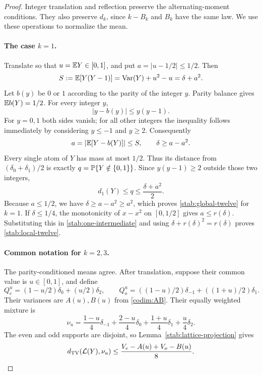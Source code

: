 \begin{proof}
Integer translation and reflection preserve the alternating-moment
conditions.  They also preserve \(d_k\), since \(k-B_k\) and \(B_k\)
have the same law.  We use these operations to normalize the mean.

\paragraph{The case \(k=1\).}
Translate so that \(u=\mathbb E Y\in[0,1]\), and put
\(a=|u-1/2|\le1/2\).  Then
\[
S:=\mathbb E[Y(Y-1)]
=\operatorname{Var}(Y)+u^2-u
=\delta+a^2.
\]
Let \(b(y)\) be \(0\) or \(1\) according to the parity of the
integer \(y\).  Parity balance gives \(\mathbb E b(Y)=1/2\).
For every integer \(y\),
\[
|y-b(y)|\le y(y-1).
\]
For \(y=0,1\) both sides vanish; for all other integers the
inequality follows immediately by considering \(y\le-1\) and
\(y\ge2\).  Consequently
\[
a=|\mathbb E[Y-b(Y)]|\le S,
\qquad
\delta\ge a-a^2.
\]
Every single atom of \(Y\) has mass at most \(1/2\).  Thus its
distance from \((\delta_0+\delta_1)/2\) is exactly
\(q=\mathbb P\{Y\notin\{0,1\}\}\).
Since \(y(y-1)\ge2\) outside those two integers,
\begin{equation}
\label{stab:one-intermediate}
d_1(Y)\le q\le\frac{\delta+a^2}{2}.
\end{equation}
Because \(a\le1/2\), we have
\(\delta\ge a-a^2\ge a^2\), which proves
\eqref{stab:global-twelve} for \(k=1\).
If \(\delta\le1/4\), the monotonicity of \(x-x^2\) on
\([0,1/2]\) gives \(a\le r(\delta)\).  Substituting this in
\eqref{stab:one-intermediate} and using
\(\delta+r(\delta)^2=r(\delta)\) proves
\eqref{stab:local-twelve}.

\paragraph{Common notation for \(k=2,3\).}
The parity-conditioned means agree.  After translation, suppose their
common value is \(u\in[0,1]\), and define
\[
Q_e^u=(1-u/2)\delta_0+(u/2)\delta_2,
\qquad
Q_o^u=((1-u)/2)\delta_{-1}+((1+u)/2)\delta_1.
\]
Their variances are \(A(u),B(u)\) from \eqref{codim:AB}.
Their equally weighted mixture is
\begin{equation}
\label{stab:nu}
\nu_u=
\frac{1-u}{4}\delta_{-1}
+\frac{2-u}{4}\delta_0
+\frac{1+u}{4}\delta_1
+\frac{u}{4}\delta_2.
\end{equation}
The even and odd supports are disjoint, so
Lemma~\ref{stab:lattice-projection} gives
\begin{equation}
\label{stab:mixture-projection}
d_{\mathrm{TV}}(\mathcal L(Y),\nu_u)
\le\frac{V_e-A(u)+V_o-B(u)}8.
\end{equation}


\end{proof}

